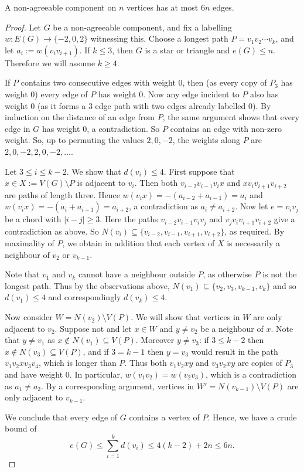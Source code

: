 \documentclass[10pt,a4paper]{amsart}
\begin{document}
\begin{lem}
\label{annoying}
A non-agreeable component on $n$
vertices has at most $6n$ edges. 
\end{lem}

\begin{proof}
Let $G$ be a non-agreeable component, and fix a labelling
$w:E(G)\to\{-2,0,2\}$ witnessing this. Choose a longest path
$P=v_1v_2\cdots v_k$, and let $a_i := w(v_iv_{i+1})$. If $k \le 3$, then $G$ is a star or triangle and $e(G) \le n$. Therefore we will assume $k \ge 4$. 

If $P$ contains two consecutive edges with weight 0, then (as every copy of $P_3$ has weight 0) every edge of $P$ has weight 0. Now any edge incident to $P$ also has weight 0 (as it forms a 3 edge path with two edges already labelled 0). By induction on the distance of an edge from $P$, the same argument shows
that every edge in $G$ has weight $0$, a contradiction. So $P$ contains an edge with non-zero weight. So, up to permuting the values $2,0,-2$,
the weights along $P$ are $2,0,-2,2,0,-2,\ldots$. 

Let $3\le i\le k-2$. We show that $d(v_i) \le 4$. First suppose that
$x \in X := V(G) \setminus P$ is adjacent to $v_i$. Then both
$v_{i-2}v_{i-1}v_ix$ and $xv_iv_{i+1}v_{i+2}$ are paths of length three.
Hence $w(v_ix)=-(a_{i-2}+a_{i-1})=a_i$ and $w(v_ix)=-(a_i+a_{i+1})=a_{i+2}$, a contradiction as $a_i\ne a_{i+2}$. Now let
$e=v_iv_j$ be a chord with $|i-j|\ge 3$. Here the paths
$v_{i-2}v_{i-1}v_iv_j$ and $v_jv_iv_{i+1}v_{i+2}$ give a contradiction as above. So $N(v_i) \subseteq \{v_{i-2},v_{i-1},v_{i+1},v_{i+2}\}$, as required. By maximality of $P$, we obtain in addition that each vertex of $X$ is necessarily a neighbour of $v_2$ or $v_{k-1}$. 

Note that $v_1$ and $v_k$ cannot have a neighbour outside $P$, as otherwise $P$ is not the longest path. Thus by the observations above, $N(v_1) \subseteq \{v_2,v_3,v_{k-1},v_k\}$ and so $d(v_1) \le 4$ and correspondingly $d(v_k) \le 4$. 

Now consider $W = N(v_2) \setminus V(P)$. We will
show that vertices in $W$ are only adjacent to $v_2$. Suppose not and let $x \in W$ and $y \ne v_2$ be a neighbour of $x$. Note that $y \ne v_1$ as $x \not\in N(v_1) \subseteq V(P)$. Moreover $y \ne v_3$: if $3\le k-2$ then $x \not\in N(v_3) \subseteq V(P)$, and if $3=k-1$ then $y = v_3$ would result in the path $v_1v_2xv_3v_4$, which is longer than $P$. Thus both $v_1v_2xy$ and $v_3v_2xy$ are copies of $P_3$ and have weight 0. In particular, $w(v_1v_2) = w(v_2v_3)$, which is a contradiction as $a_1 \ne a_2$.
By a corresponding argument, vertices in $W' = N(v_{k-1})\setminus V(P)$ are only adjacent to $v_{k-1}$.




We conclude that every edge of $G$ contains a vertex of $P$. Hence, we have a crude bound of
$$e(G) \le \sum_{i=1}^k d(v_i) \le 4(k-2) + 2n  \le 6n.$$

\end{proof}
\end{document}
